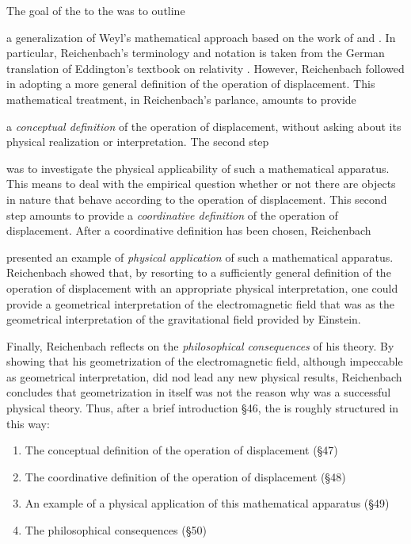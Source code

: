 \documentclass[submitted]{article}
\newcommand{\PRZL}{\citetitle{Reichenbach1928}\xspace}
\begin{document}
\begin{inparaenum}[(1)] The goal of the \Ap to the \PRZL was to outline \item a generalization of Weyl's mathematical approach based on the work of \citet{Eddington1923} and \citet{Schouten1922}. In particular, Reichenbach's terminology and notation is taken from the German translation \citep{Eddington1925a} of Eddington's textbook on relativity \citep{Eddington1923}. However, Reichenbach followed \citet{Schouten1922} in adopting a more general definition of the operation of displacement. This mathematical treatment, in Reichenbach's parlance, amounts to provide \item a \emph{conceptual definition} of the operation of displacement, without asking about its physical realization or interpretation. The second step \item was to investigate the physical applicability of such a mathematical apparatus. This means to deal with the empirical question whether or not there are objects in nature that behave according to the operation of displacement. This second step amounts to provide a \emph{coordinative definition} of the operation of displacement. After a coordinative definition has been chosen, Reichenbach \item presented an example of \emph{physical application} of such a mathematical apparatus. Reichenbach showed that, by resorting to a sufficiently general definition of the operation of displacement with an appropriate physical interpretation, one could provide a geometrical interpretation of the electromagnetic field that was  as the geometrical interpretation of the gravitational field provided by Einstein. \item Finally, Reichenbach reflects on the \emph{philosophical consequences} of his theory. By showing that his geometrization of the electromagnetic field, although impeccable as geometrical interpretation, did nod lead any new physical results, Reichenbach concludes that geometrization in itself was not the reason why \gr was a successful physical theory. Thus, after a brief introduction \S46, the \Ap is roughly structured in this way:\end{inparaenum}

\begin{enumerate}
 \item The conceptual definition of the operation of displacement (\S47)
 \item The coordinative definition of the operation of displacement (\S 48)
 \item An example of a physical application of this mathematical apparatus (\S 49)
 \item The philosophical consequences (\S50)
\end{enumerate}
\end{document}
